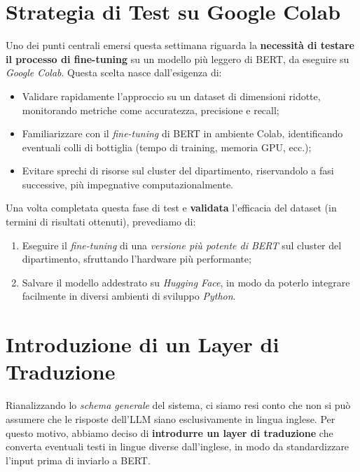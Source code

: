 \documentclass[a4paper,12pt]{article}
\begin{document}
\section*{Strategia di Test su Google Colab}
Uno dei punti centrali emersi questa settimana riguarda la \textbf{necessità di testare il processo di fine-tuning} su un modello più leggero di BERT, da eseguire su \emph{Google Colab}. Questa scelta nasce dall’esigenza di:
\begin{itemize}
    \item Validare rapidamente l’approccio su un dataset di dimensioni ridotte, monitorando metriche come accuratezza, precisione e recall;
    \item Familiarizzare con il \emph{fine-tuning} di BERT in ambiente Colab, identificando eventuali colli di bottiglia (tempo di training, memoria GPU, ecc.);
    \item Evitare sprechi di risorse sul cluster del dipartimento, riservandolo a fasi successive, più impegnative computazionalmente.
\end{itemize}

Una volta completata questa fase di test e \textbf{validata} l’efficacia del dataset (in termini di risultati ottenuti), prevediamo di:
\begin{enumerate}
    \item Eseguire il \emph{fine-tuning} di una \emph{versione più potente di BERT} sul cluster del dipartimento, sfruttando l’hardware più performante;
    \item Salvare il modello addestrato su \emph{Hugging Face}, in modo da poterlo integrare facilmente in diversi ambienti di sviluppo \emph{Python}.
\end{enumerate}

\section*{Introduzione di un Layer di Traduzione}
Rianalizzando lo \emph{schema generale} del sistema, ci siamo resi conto che non si può assumere che le risposte dell’LLM siano esclusivamente in lingua inglese. Per questo motivo, abbiamo deciso di \textbf{introdurre un layer di traduzione} che converta eventuali testi in lingue diverse dall’inglese, in modo da standardizzare l’input prima di inviarlo a BERT.
\end{document}
